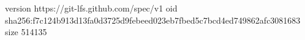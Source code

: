 version https://git-lfs.github.com/spec/v1
oid sha256:f7c124b913d13fa0d3725d9febeed023eb7fbed5c7bcd4ed749862afc3081683
size 514135
